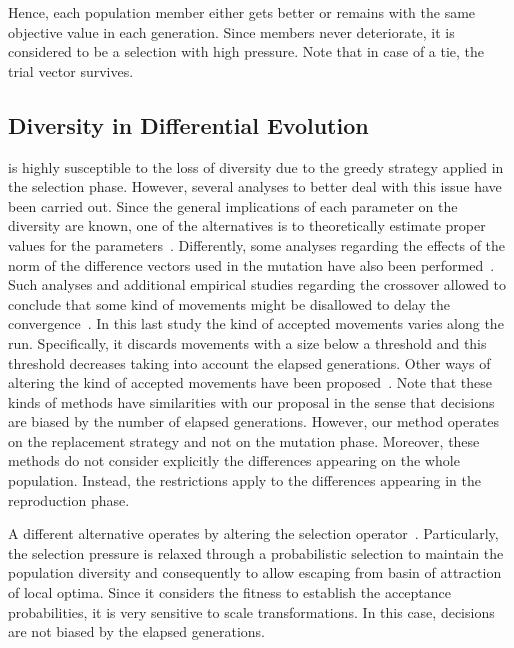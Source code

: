 Hence, each population member either gets better or remains with the same objective value in each generation.
%
Since members never deteriorate, it is considered to be a selection with high pressure.
%
Note that in case of a tie, the trial vector survives.

%

\subsection{Diversity in Differential Evolution}

\DE{} is highly susceptible to the loss of diversity due to the greedy strategy applied in the selection phase.
%
However, several analyses to better deal with this issue have been carried out.
%
Since the general implications of each parameter on the diversity are known, one of
the alternatives is to theoretically estimate proper values for the \DE{} parameters~\cite{zaharie2003control}.
%
Differently, some analyses regarding the effects of the norm of the difference vectors used in the mutation
have also been performed~\cite{montgomery2009differential}.
%
Such analyses and additional empirical studies regarding the crossover allowed to conclude that some kind of movements 
might be disallowed to delay the convergence~\cite{montgomery2012simple}.
%
In this last study the kind of accepted movements varies along the run.
%
Specifically, it discards movements with a size below a threshold and this threshold decreases taking into account the elapsed generations.
%
Other ways of altering the kind of accepted movements have been proposed~\cite{bolufe2013differential}.
%
Note that these kinds of methods have similarities with our proposal in the sense that decisions are biased by the number of elapsed generations.
%
However, our method operates on the replacement strategy and not on the mutation phase.
%
Moreover, these methods do not consider explicitly the differences appearing on the whole population.
%
Instead, the restrictions apply to the differences appearing in the reproduction phase.

A different alternative operates by altering the selection operator~\cite{sa2008exploration}.
%
Particularly, the selection pressure is relaxed through a probabilistic selection to maintain the population diversity and consequently 
to allow escaping from basin of attraction of local optima.
%
Since it considers the fitness to establish the acceptance probabilities, it is very sensitive to scale transformations.
%
In this case, decisions are not biased by the elapsed generations.

